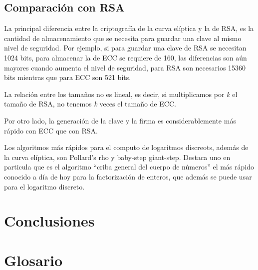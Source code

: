 \documentclass[11pt]{article}
\begin{document}
\subsection{Comparación con RSA}

La principal diferencia entre la criptografía de la curva elíptica y la de RSA, es la cantidad de almacenamiento que se necesita para guardar una clave al mismo nivel de seguridad. Por ejemplo, si para guardar una clave de RSA se necesitan 1024 bits, para almacenar la de ECC se requiere de 160, las diferencias son aún mayores cuando aumenta el nivel de seguridad, para RSA son necesarios 15360 bits mientras que para ECC son 521 bits.

La relación entre los tamaños no es lineal, es decir, si multiplicamos por \textit{k} el tamaño de RSA, no tenemos \textit{k} veces el tamaño de ECC.

Por otro lado, la generación de la clave y la firma es considerablemente más rápido con ECC que con RSA.


Los algoritmos más rápidos para el computo de logaritmos discreots, además de la curva elíptica, son Pollard's rho y baby-step giant-step. Destaca uno en particula que es el algoritmo ``criba general del cuerpo de números'' el más rápido conocido a día de hoy para la factorización de enteros, que además se puede usar para el logaritmo discreto.


\section{Conclusiones}




\appendix
\renewcommand{\thesection}{\Roman{section}}
\setcounter{section}{0}
\section{Glosario}
\end{document}
